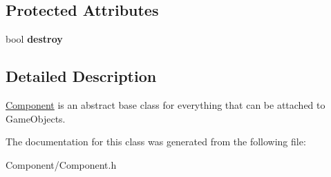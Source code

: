\subsection*{Protected Attributes}
\begin{DoxyCompactItemize}
\item 
\mbox{\label{classrvl_1_1_component_aa5cd621700ec5a36be00f9fbd9ef9b8f}} 
bool {\bfseries destroy}
\end{DoxyCompactItemize}


\subsection{Detailed Description}
\hyperlink{classrvl_1_1_component}{Component} is an abstract base class for everything that can be attached to Game\+Objects. 

The documentation for this class was generated from the following file\+:\begin{DoxyCompactItemize}
\item 
Component/Component.\+h\end{DoxyCompactItemize}
